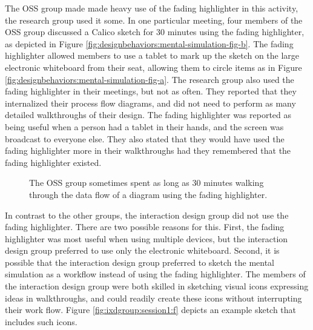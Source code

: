 The OSS group made made heavy use of the fading highlighter in this activity, the research group used it some. In one particular meeting, four members of the OSS group discussed a Calico sketch for 30 minutes using the fading highlighter, as depicted in Figure \ref{fig:designbehaviors:mental-simulation-fig-b}. The fading highlighter allowed members to use a tablet to mark up the sketch on the large electronic whiteboard from their seat, allowing them to circle items as in Figure \ref{fig:designbehaviors:mental-simulation-fig-a}.  The research group also used the fading highlighter in their meetings, but not as often. They reported that they internalized their process flow diagrams, and did not need to perform as many detailed walkthroughs of their design. The fading highlighter was reported as being useful when a person had a tablet in their hands, and the screen was broadcast to everyone else. They also stated that they would have used the fading highlighter more in their walkthroughs had they remembered that the fading highlighter existed.

\begin{figure}%
  \centering
   \caption {The OSS group sometimes spent as long as 30 minutes walking through the data flow of a diagram using the fading highlighter.}
   \label{fig:designbehaviors:mental-simulation-fig}   
\end{figure}%

In contrast to the other groups, the interaction design group did not use the fading highlighter. There are two possible reasons for this. First, the fading highlighter was most useful when using multiple devices, but the interaction design group preferred to use only the electronic whiteboard. Second, it is possible that the interaction design group preferred to sketch the mental simulation as a workflow instead of using the fading highlighter. The members of the interaction design group were both skilled in sketching visual icons expressing ideas in walkthroughs, and could readily create these icons without interrupting their work flow. Figure \ref{fig:ixdgroup:session1:f} depicts an example sketch that includes such icons.

